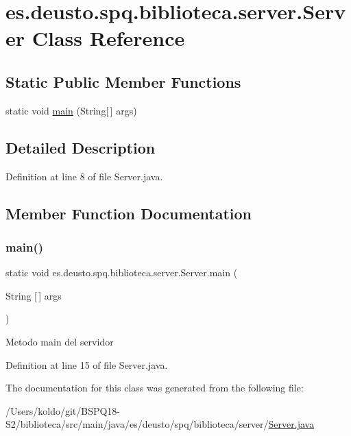 \hypertarget{classes_1_1deusto_1_1spq_1_1biblioteca_1_1server_1_1_server}{}\section{es.\+deusto.\+spq.\+biblioteca.\+server.\+Server Class Reference}
\label{classes_1_1deusto_1_1spq_1_1biblioteca_1_1server_1_1_server}
\subsection*{Static Public Member Functions}
\begin{DoxyCompactItemize}
\item 
static void \mbox{\hyperlink{classes_1_1deusto_1_1spq_1_1biblioteca_1_1server_1_1_server_a0a075fe4c8da81d4dfefcb20a840e619}{main}} (String\mbox{[}$\,$\mbox{]} args)
\end{DoxyCompactItemize}


\subsection{Detailed Description}


Definition at line 8 of file Server.\+java.



\subsection{Member Function Documentation}
\mbox{\label{classes_1_1deusto_1_1spq_1_1biblioteca_1_1server_1_1_server_a0a075fe4c8da81d4dfefcb20a840e619}} 
\subsubsection{\texorpdfstring{main()}{main()}}
{\footnotesize\ttfamily static void es.\+deusto.\+spq.\+biblioteca.\+server.\+Server.\+main (\begin{DoxyParamCaption}\item[{String \mbox{[}$\,$\mbox{]}}]{args }\end{DoxyParamCaption})\hspace{0.3cm}{\ttfamily [static]}}

Metodo main del servidor 

Definition at line 15 of file Server.\+java.



The documentation for this class was generated from the following file\+:\begin{DoxyCompactItemize}
\item 
/\+Users/koldo/git/\+B\+S\+P\+Q18-\/\+S2/biblioteca/src/main/java/es/deusto/spq/biblioteca/server/\mbox{\hyperlink{_server_8java}{Server.\+java}}\end{DoxyCompactItemize}
